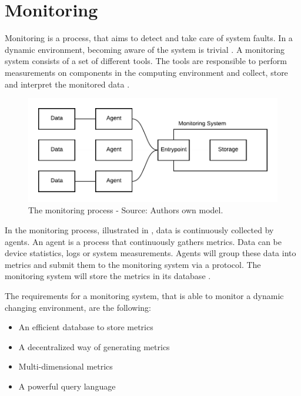 \section{Monitoring}
Monitoring is a process, that aims to detect and take care of system faults. In a dynamic environment, becoming aware of the system is trivial \cite{Ligus2012EffMonitoring}.
A monitoring system consists of a set of different tools. The tools are responsible to perform measurements on components in the computing environment and collect, store and interpret the monitored data \cite{Ligus2012EffMonitoring}. 


\begin{figure}[h]
\centering
\includegraphics[scale=0.9]{images/02_theoretical_foundation/monitoring/monitoring_system}
\caption{The monitoring process - Source: Authors own model.}
\label{fig:mon_mon-system-process}
\end{figure}
In the monitoring process, illustrated in , data is continuously collected by agents. An agent is a process that continuously gathers metrics. Data can be device statistics, logs or system measurements. Agents will group these data into metrics and submit them to the monitoring system via a protocol. The monitoring system will store the metrics in its database \cite{Ligus2012EffMonitoring}.


The requirements for a monitoring system, that is able to monitor a dynamic changing environment, are the following:
\begin{itemize}
\item An efficient database to store metrics
\item A decentralized way of generating metrics \cite{Farcic2017Toolkit21} %
\item Multi-dimensional metrics \cite{Farcic2017Toolkit21}
\item A powerful query language \cite{Farcic2017Toolkit21}
\end{itemize}


